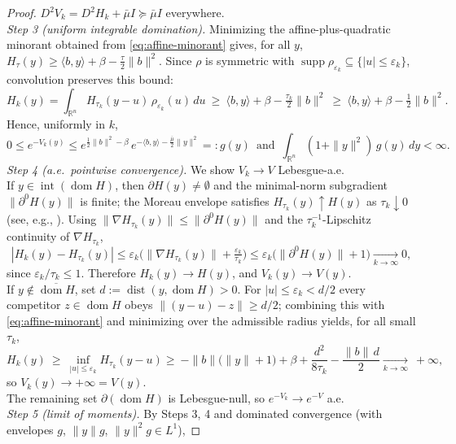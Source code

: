 \documentclass[11pt]{article}
\newcommand{\1}{\mathds{1}}
\theoremstyle{definition}
\theoremstyle{remark}
\theoremstyle{definition}
\begin{document}
\begin{proof}
\(D^{2}V_k=D^{2}H_k+\bar\mu I\succeq\bar\mu I\) everywhere.\\
\noindent \emph{Step 3 (uniform integrable domination).}
Minimizing the affine-plus-quadratic minorant obtained from
\eqref{eq:affine-minorant} gives, for all \(y\),
\(H_\tau(y)\ge\langle b,y\rangle+\beta-\tfrac{\tau}{2}\|b\|^{2}\). Since \(\rho\)
is symmetric with \(\operatorname{supp}\rho_{\varepsilon_k}\subseteq
\{|u|\le\varepsilon_k\}\), convolution preserves this bound:
\[
H_k(y)=\int_{\mathbb R^n} H_{\tau_k}(y-u)\,\rho_{\varepsilon_k}(u)\,du
\ \ge\ \langle b,y\rangle+\beta-\tfrac{\tau_k}{2}\|b\|^{2}
\ \ge\ \langle b,y\rangle+\beta-\tfrac12\|b\|^{2}.
\]
Hence, uniformly in \(k\),
\[
0\le e^{-V_k(y)}\le e^{\frac12\|b\|^{2}-\beta}\,
e^{-\langle b,y\rangle-\frac{\bar\mu}{2}\|y\|^{2}}=:g(y) \,\textrm{ and }\, \int_{\mathbb R^n}(1+\|y\|^{2})\,g(y)\,dy<\infty .
\]
\noindent \emph{Step 4 (a.e.\ pointwise convergence).}
We show \(V_k\to V\) Lebesgue-a.e.\\
If \(y\in\operatorname{int}(\operatorname{dom}H)\), then \(\partial H(y)\neq\emptyset\)
and the minimal-norm subgradient \(\|\partial^{0}H(y)\|\) is finite; the Moreau
envelope satisfies \(H_{\tau_k}(y)\uparrow H(y)\) as \(\tau_k\downarrow0\)
 (see, e.g., \cite[Thm~1.25]{RockafellarWets1998}). Using
\(\|\nabla H_{\tau_k}(y)\|\le\|\partial^{0}H(y)\|\) and the
\(\tau_k^{-1}\)-Lipschitz continuity of \(\nabla H_{\tau_k}\),
\[
|H_k(y)-H_{\tau_k}(y)|
\le \varepsilon_k\Big(\|\nabla H_{\tau_k}(y)\|+\tfrac{\varepsilon_k}{\tau_k}\Big)
\le \varepsilon_k\big(\|\partial^{0}H(y)\|+1\big)\xrightarrow[k\to\infty]{}0 ,
\]
since \(\varepsilon_k/\tau_k\le1\). Therefore \(H_k(y)\to H(y)\), and
\(V_k(y)\to V(y)\).\\
If \(y\notin\overline{\operatorname{dom}H}\), set \(d:=\operatorname{dist}(y,\operatorname{dom}H)>0\).
For \(|u|\le\varepsilon_k<d/2\) every competitor \(z\in\operatorname{dom}H\) obeys
\(\|(y-u)-z\|\ge d/2\); combining this with \eqref{eq:affine-minorant} and
minimizing over the admissible radius yields, for all small \(\tau_k\),
\[
H_k(y)\ \ge\ \inf_{|u|\le\varepsilon_k}H_{\tau_k}(y-u)
 \ge\ -\|b\|\big(\|y\|+1\big)+\beta+\frac{d^{2}}{8\tau_k}-\frac{\|b\|\,d}{2}
 \xrightarrow[k\to\infty]{}\ +\infty ,
\]
so \(V_k(y)\to+\infty=V(y)\).\\
The remaining set \(\partial(\operatorname{dom}H)\) is Lebesgue-null, so
\(e^{-V_k}\to e^{-V}\) a.e.\\
\noindent \emph{Step 5 (limit of moments).}
By Steps 3, 4 and dominated convergence (with envelopes \(g\), \(\|y\|g\),
\(\|y\|^{2}g\in L^{1}\)),

\end{proof}
\end{document}
